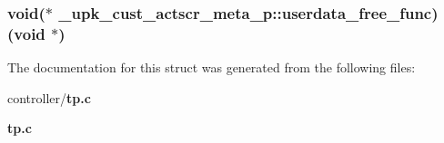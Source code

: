 \subsubsection[{userdata\_\-free\_\-func}]{\setlength{\rightskip}{0pt plus 5cm}void($\ast$ {\bf \_\-upk\_\-cust\_\-actscr\_\-meta\_\-p::userdata\_\-free\_\-func})(void $\ast$)}\label{struct__upk__cust__actscr__meta__p_abdc2b6954abb4508393f2c9d9ae6e64e}


The documentation for this struct was generated from the following files:\begin{DoxyCompactItemize}
\item 
controller/{\bf tp.c}\item 
{\bf tp.c}\end{DoxyCompactItemize}

